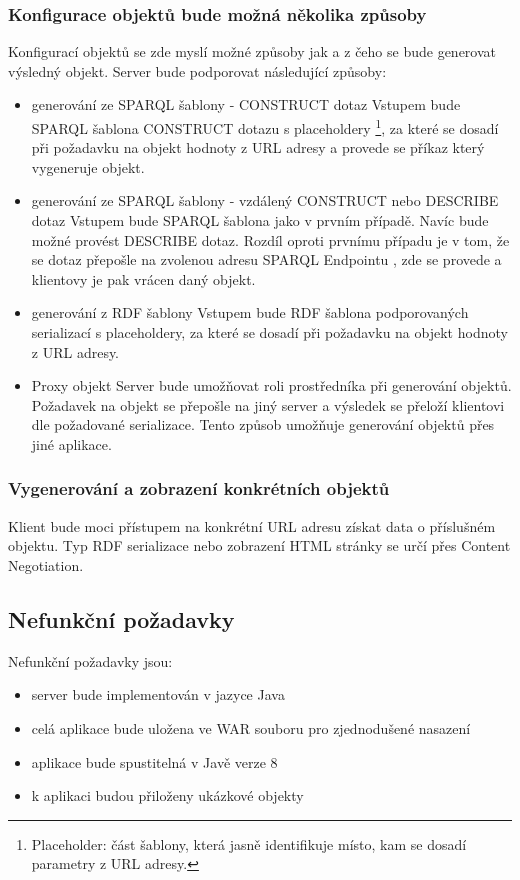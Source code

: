 \documentclass[thesis=B,czech]{FITthesis}[2012/06/26]
\begin{document}
  
  \subsubsection{Konfigurace objektů bude možná několika způsoby}  
  \label{sec:object_types}
  Konfigurací objektů se zde myslí možné způsoby jak a z čeho se bude generovat výsledný objekt. Server bude podporovat
  následující způsoby:
  \begin{itemize}
    \item generování ze SPARQL šablony - CONSTRUCT dotaz \cite{sparql_bob}
      \subitem Vstupem bude SPARQL šablona CONSTRUCT dotazu s placeholdery \footnote{Placeholder: část šablony, která jasně identifikuje místo, 
      kam se dosadí parametry z URL adresy.}, za které se dosadí při požadavku na objekt hodnoty z URL adresy
      a provede se příkaz který vygeneruje objekt.
      
     \item generování ze SPARQL šablony - vzdálený CONSTRUCT nebo DESCRIBE dotaz \cite{sparql_bob}
      \subitem Vstupem bude SPARQL šablona jako v prvním případě. Navíc bude možné provést DESCRIBE dotaz. Rozdíl oproti prvnímu případu je v tom, že se 
      dotaz přepošle na zvolenou adresu SPARQL Endpointu \cite{sparql_bob}, zde se provede a klientovy je pak vrácen daný objekt.
      
    \item generování z RDF šablony
     \subitem Vstupem bude RDF šablona podporovaných serializací s placeholdery, za které se dosadí při požadavku na objekt hodnoty z URL adresy. 
     
     \item Proxy objekt
      \subitem Server bude umožňovat roli prostředníka při generování objektů. Požadavek na objekt se přepošle na jiný server a výsledek se přeloží
      klientovi dle požadované serializace. Tento způsob umožňuje generování objektů přes jiné aplikace.
 \end{itemize}
 
 
  
  \subsubsection{Vygenerování a zobrazení konkrétních objektů}  
  Klient bude moci přístupem na konkrétní URL adresu získat data o příslušném objektu. Typ RDF serializace nebo zobrazení HTML stránky se určí přes 
  Content Negotiation.

\subsection{Nefunkční požadavky}
Nefunkční požadavky jsou:
\begin{itemize}
    \item server bude implementován v jazyce Java
    \item celá aplikace bude uložena ve WAR souboru pro zjednodušené nasazení
    \item aplikace bude spustitelná v Javě verze 8
    \item k aplikaci budou přiloženy ukázkové objekty
 \end{itemize}
 
\end{document}
